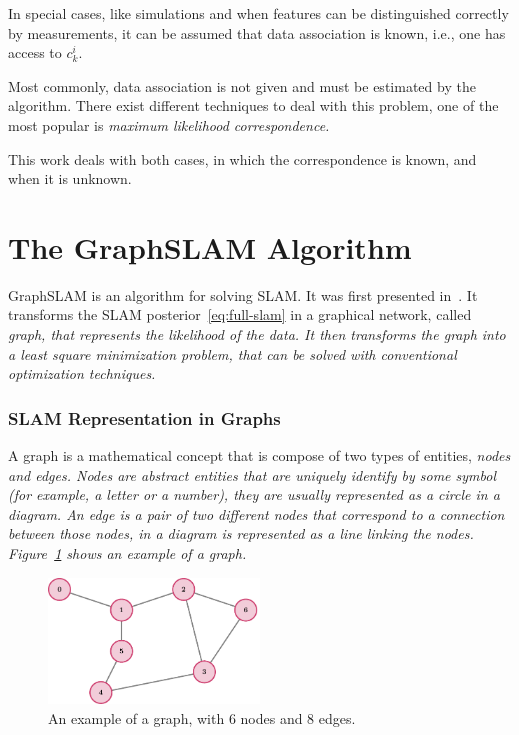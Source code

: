 In special cases, like simulations and when features can be distinguished correctly by measurements, it can be assumed that data association is known, i.e., one has access to $c_k^i$. 

Most commonly, data association is not given and must be estimated by the algorithm. There exist different techniques to deal with this problem, one of the most popular is \it{maximum likelihood correspondence}.

This work deals with both cases, in which the correspondence is known, and when it is unknown.

\section{The GraphSLAM Algorithm}
\label{sec:graphslam-description}

GraphSLAM is an algorithm for solving SLAM. It was first presented in~\cite{graphslam}. It transforms the SLAM posterior~\eqref{eq:full-slam} in a graphical network, called \it{graph}, that represents the likelihood of the data. It then transforms the graph into a least square minimization problem, that can be solved with conventional optimization techniques.

\subsubsection{SLAM Representation in Graphs}

A graph is a mathematical concept that is compose of two types of entities, \it{nodes} and \it{edges}. Nodes are abstract entities that are uniquely identify by some symbol (for example, a letter or a number), they are usually represented as a circle in a diagram. An edge is a pair of two different nodes that correspond to a connection between those nodes, in a diagram is represented as a line linking the nodes. Figure~\ref{fig:graph} shows an example of a graph.

\begin{figure}[htbp!]
    \centering
    \includegraphics[width=0.5\textwidth]{tikz/graph.pdf}
    \caption[An example of a graph]{An example of a graph, with 6 nodes and 8 edges.}
    \label{fig:graph}
\end{figure}  

